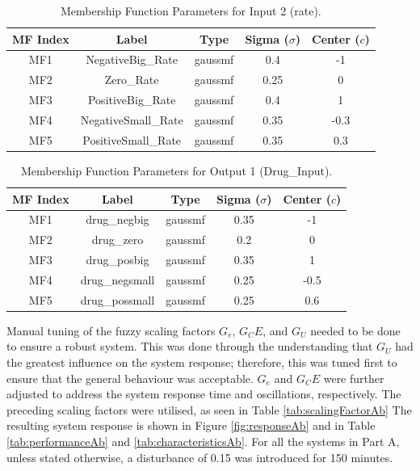 \documentclass[12pt]{article}
\begin{document}
\begin{table}[H]
\centering
\begin{tabular}{|c|c|c|c|c|}
\hline
\textbf{MF Index} & \textbf{Label} & \textbf{Type} & \textbf{Sigma ($\sigma$)} & \textbf{Center ($c$)} \\ \hline
MF1 & NegativeBig\_Rate & gaussmf & 0.4 & -1 \\ \hline
MF2 & Zero\_Rate & gaussmf & 0.25 & 0 \\ \hline
MF3 & PositiveBig\_Rate & gaussmf & 0.4 & 1 \\ \hline
MF4 & NegativeSmall\_Rate & gaussmf & 0.35 & -0.3 \\ \hline
MF5 & PositiveSmall\_Rate & gaussmf & 0.35 & 0.3 \\ \hline
\end{tabular}
\caption{Membership Function Parameters for Input 2 (rate).}
\label{tab:errorRate}
\end{table}

\begin{table}[H]
\centering
\begin{tabular}{|c|c|c|c|c|}
\hline
\textbf{MF Index} & \textbf{Label} & \textbf{Type} & \textbf{Sigma ($\sigma$)} & \textbf{Center ($c$)} \\ \hline
MF1 & drug\_negbig & gaussmf & 0.35 & -1 \\ \hline
MF2 & drug\_zero & gaussmf & 0.2 & 0 \\ \hline
MF3 & drug\_posbig & gaussmf & 0.35 & 1 \\ \hline
MF4 & drug\_negsmall & gaussmf & 0.25 & -0.5 \\ \hline
MF5 & drug\_possmall & gaussmf & 0.25 & 0.6 \\ \hline
\end{tabular}
\caption{Membership Function Parameters for Output 1 (Drug\_Input).}
\label{tab:output}
\end{table}


Manual tuning of the fuzzy scaling factors $G_e$, $G_CE$, and $G_U$ needed to be done to ensure a robust system. 
This was done through the understanding that $G_U$ had the greatest influence on the system response; therefore, this was tuned first to ensure that the general behaviour was acceptable. 
$G_e$ and $G_CE$ were further adjusted to address the system response time and oscillations, respectively.
The preceding scaling factors were utilised, as seen in Table \ref{tab:scalingFactorAb}
The resulting system response is shown in Figure \ref{fig:responseAb} and in Table \ref{tab:performanceAb} and \ref{tab:characteristicsAb}.
For all the systems in Part A, unless stated otherwise, a disturbance of 0.15 was introduced for 150 minutes.
\\
\end{document}
